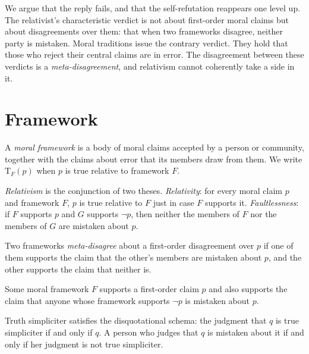 \documentclass{situationist-preprint}
\begin{document}
We argue that the reply fails, and that the self-refutation reappears one level up. The relativist's characteristic verdict is not about first-order moral claims but about disagreements over them: that when two frameworks disagree, neither party is mistaken. Moral traditions issue the contrary verdict. They hold that those who reject their central claims are in error. The disagreement between these verdicts is a \emph{meta-disagreement}, and relativism cannot coherently take a side in it.

\section{Framework}

\begin{definition}\label{d:framework}
A \emph{moral framework} is a body of moral claims accepted by a person or community, together with the claims about error that its members draw from them. We write $\mathrm{T}_F(p)$ when $p$ is true relative to framework $F$.
\end{definition}

\begin{definition}\label{d:rel}
\emph{Relativism} is the conjunction of two theses. \emph{Relativity}: for every moral claim $p$ and framework $F$, $p$ is true relative to $F$ just in case $F$ supports it. \emph{Faultlessness}: if $F$ supports $p$ and $G$ supports $\neg p$, then neither the members of $F$ nor the members of $G$ are mistaken about $p$.
\end{definition}

\begin{definition}\label{d:meta}
Two frameworks \emph{meta-disagree} about a first-order disagreement over $p$ if one of them supports the claim that the other's members are mistaken about $p$, and the other supports the claim that neither is.
\end{definition}

\begin{assumption}\label{a:objfw}
Some moral framework $F$ supports a first-order claim $p$ and also supports the claim that anyone whose framework supports $\neg p$ is mistaken about $p$.
\end{assumption}

\begin{assumption}[Disquotation]\label{a:tschema}
Truth simpliciter satisfies the disquotational schema: the judgment that $q$ is true simpliciter if and only if $q$. A person who judges that $q$ is mistaken about it if and only if her judgment is not true simpliciter.
\end{assumption}
\end{document}
